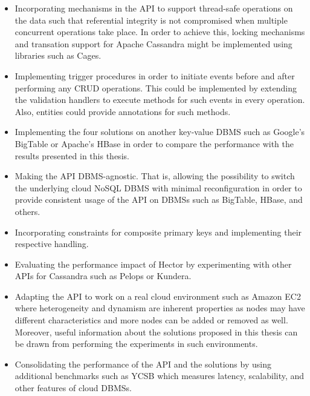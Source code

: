 \begin{itemize}
  \item Incorporating mechanisms in the \ac{API} to support thread-safe operations
  on the data such that referential integrity is not compromised when multiple
  concurrent operations take place. In order to achieve this, locking mechanisms
  and transation support for Apache Cassandra might be implemented using
  libraries such as Cages.
  
  \item Implementing trigger procedures in order to initiate events before and
  after performing any \ac{CRUD} operations. This could be implemented by
  extending the validation handlers to execute methods for such events in every
  operation. Also, entities could provide annotations for such methods.
  
  \item Implementing the four solutions on another key-value \ac{DBMS} such as
  Google's BigTable or Apache's HBase in order to compare the performance with 
  the results presented in this thesis. 
  
  \item Making the \ac{API} \ac{DBMS}-agnostic. That is, allowing the
  possibility to switch the underlying cloud NoSQL \ac{DBMS} with minimal
  reconfiguration in order to provide consistent usage of the \ac{API} on
  \acp{DBMS} such as BigTable, HBase, and others.
  
  \item Incorporating constraints for composite primary keys and implementing
  their respective handling.
  
  
  \item Evaluating the performance impact of Hector by experimenting with other
  \acp{API} for Cassandra such as Pelops or Kundera.
  
  
  \item Adapting the \ac{API} to work on a real cloud environment such as Amazon
  EC2 where heterogeneity and  dynamism  are inherent properties as nodes may
  have different characteristics and more nodes can be added or
  removed as well.
  Moreover, useful information about the solutions proposed in this thesis 
  can be drawn from performing the experiments in such environments.
  
  \item Consolidating the performance of the \ac{API} and the solutions 
  by using additional benchmarks such as \ac{YCSB} which measures latency,
  scalability, and other features of cloud \acp{DBMS}.
 
 \end{itemize}
  
